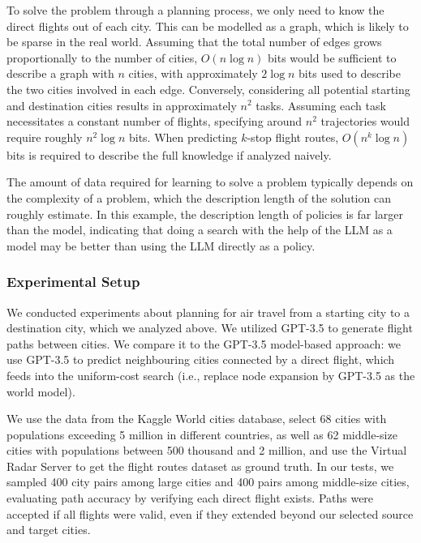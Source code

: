 To solve the problem through a planning process, we only need to know the direct flights out of each city. This can be modelled as a graph, which is likely to be sparse in the real world. Assuming that the total number of edges grows proportionally to the number of cities, $O(n\log n)$ bits would be sufficient to describe a graph with $n$ cities, with approximately $2\log n$ bits used to describe the two cities involved in each edge. Conversely, considering all potential starting and destination cities results in approximately $n^2$ tasks. Assuming each task necessitates a constant number of flights, specifying around $n^2$ trajectories would require roughly $n^2\log n$ bits. When predicting $k$-stop flight routes, $O(n^k\log n)$ bits is required to describe the full knowledge if analyzed naively. 

The amount of data required for learning to solve a problem typically depends on the complexity of a problem, which the description length of the solution can roughly estimate. In this example, the description length of policies is far larger than the model, indicating that doing a search with the help of the LLM as a model may be better than using the LLM directly as a policy. 

\subsubsection{Experimental Setup}We conducted experiments about planning for air travel from a starting city to a destination city, which we analyzed above. We utilized GPT-3.5 to generate flight paths between cities. We compare it to the GPT-3.5 model-based approach: we use GPT-3.5 to predict neighbouring cities connected by a direct flight, which feeds into the uniform-cost search (i.e., replace node expansion by GPT-3.5 as the world model). 

We use the data from the Kaggle World cities database, select 68 cities with populations exceeding 5 million in different countries, as well as 62 middle-size cities with populations between 500 thousand and 2 million, and use the Virtual Radar Server to get the flight routes dataset as ground truth. In our tests, we sampled 400 city pairs among large cities and 400 pairs among middle-size cities, evaluating path accuracy by verifying each direct flight exists. Paths were accepted if all flights were valid, even if they extended beyond our selected source and target cities. 

